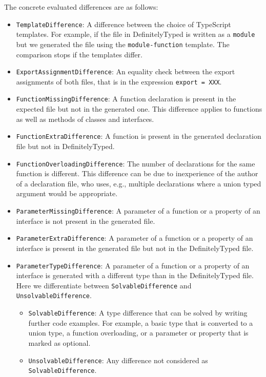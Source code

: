 \documentclass[english,cleveref,autoref,submission]{programming}
\begin{document}
The concrete evaluated differences are as follows:
\begin{itemize}
  \item \texttt{TemplateDifference}: A difference between the choice of TypeScript
    templates. For example, if the file in DefinitelyTyped is written as a \texttt{module}
    but we generated the file using the \texttt{module-function} template. The comparison
    stops if the templates differ. 
  \item \texttt{ExportAssignmentDifference}: An equality check between the export
    assignments of both files, that is in the expression \lstinline{export = XXX}. 
  \item \texttt{FunctionMissingDifference}: A function declaration is present in the expected
    file but not in the generated one. This difference applies to functions as well as methods of classes
    and interfaces. 
  \item \texttt{FunctionExtraDifference}: A function is present in the generated declaration file but not in DefinitelyTyped.
  \item \texttt{FunctionOverloadingDifference}: The number of declarations for the same
    function is different. This difference can be due to inexperience of the author of a
    declaration file, who uses, e.g., multiple declarations where a union typed argument
    would be appropriate.
  \item \texttt{ParameterMissingDifference}: A parameter of a function or a property of an interface is not present in the generated file.
  \item \texttt{ParameterExtraDifference}: A parameter of a function or a property of an
    interface is present in the generated file but not in the DefinitelyTyped file. 
  \item \texttt{ParameterTypeDifference}: A parameter of a function or a property of an interface is generated with a different type than in the DefinitelyTyped file. Here we differentiate between \texttt{SolvableDifference} and \texttt{UnsolvableDifference}.
  \begin{itemize}
    \item \texttt{SolvableDifference}: A type difference that can be solved by writing
      further code examples. For example, a basic type that is converted to a union type,
      a function overloading, or a parameter or property that is marked as optional. 
    \item \texttt{UnsolvableDifference}: Any difference not considered as \texttt{SolvableDifference}.
  \end{itemize}
\end{itemize}
\end{document}
